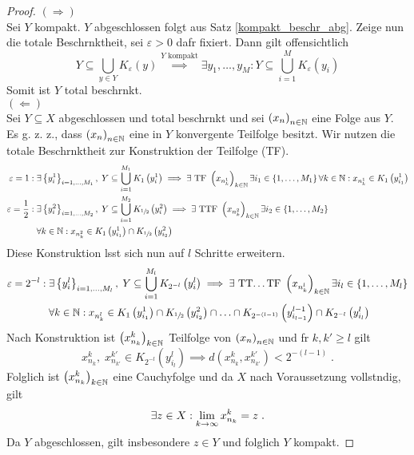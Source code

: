 \begin{proof}
	 \((\Longrightarrow)\)\\
	 Sei $Y$ kompakt. $Y$ abgeschlossen folgt aus Satz  \ref{kompakt_beschr_abg}. Zeige nun die totale Beschr\as nktheit, sei $\varepsilon>0$ daf\us r fixiert. Dann gilt offensichtlich
	 \[Y \subseteq \bigcup_{y\in Y} K_\varepsilon(y) \overset{\text{$Y$ kompakt}}{\implies}\exists y_1,\ldots,y_M: Y \subseteq \bigcup_{i=1}^M K_\varepsilon(y_i)\]
	 Somit ist $Y$ total beschr\as nkt. \\
	 \((\Longleftarrow)\)\\
	 Sei $Y\subseteq X$ abgeschlossen und total beschr\as nkt und sei \(\left (x_n\right )_{n\in \mathbb{N}}\) eine Folge aus $Y$. Es g. z. z., dass \(\left (x_n\right )_{n\in \mathbb{N}}\) eine in $Y$ konvergente Teilfolge besitzt. 
	 Wir nutzen die totale Beschr\as nktheit zur Konstruktion der Teilfolge (TF).
	 \begin{align*}
	  \varepsilon = 1: \; &\exists \left\{y^1_i\right\}_{i = 1,\ldots, M_1}, \; Y \subseteq \bigcup_{i=1}^{M_1} K_1\left(y^1_i\right) \implies \exists \text{ TF } \left (x_{n^1_k}\right )_{k\in \mathbb{N}} \exists i_1 \in \left\{1,\ldots,M_1\right\} \forall k \in \mathbb{N}: x_{n^1_k} \in K_1\left(y_{i_1}^1\right) \\
	 	 \varepsilon = \frac{1}{2}: \; &\exists \left\{y^2_i\right\}_{i = 1,\ldots, M_2}, \; Y \subseteq \bigcup_{i=1}^{M_2} K_{\sfrac12}\left(y^2_i\right) \implies \exists \text{ TTF } \left (x_{n^2_k}\right )_{k\in \mathbb{N}} \exists i_2 \in \left\{1,\ldots,M_2\right\}\\
	 	 & \forall k \in \mathbb{N}: x_{n^2_k} \in K_1\left(y_{i_1}^1\right) \cap K_{\sfrac12}\left(y_{i_2}^2\right)
	 \end{align*}
	 Diese Konstruktion l\as sst sich nun auf $l$ Schritte erweitern.
	 \begin{align*}
	 	 \varepsilon = 2^{-l}: \; &\exists \left\{y^l_i\right\}_{i = 1,\ldots, M_l}, \; Y \subseteq \bigcup_{i=1}^{M_l} K_{2^{-l}}\left(y^l_i\right) \implies \exists \text{ TT\ldots TF } \left (x_{n^l_k}\right )_{k\in \mathbb{N}} \exists i_l \in \left\{1,\ldots,M_l\right\}\\
	 	& \forall k \in \mathbb{N}: x_{n^l_k} \in K_1\left(y_{i_1}^1\right) \cap K_{\sfrac12}\left(y_{i_2}^2\right) \cap \ldots \cap K_{2^{-(l-1)}}\left(y_{i_{l-1}}^{l-1}\right) \cap K_{2^{-l}}\left(y_{i_{l}}^l\right)
	 	\end{align*}
	 Nach Konstruktion ist \(\left (x_{n_k}^k\right )_{k\in \mathbb{N}}\) Teilfolge von \(\left (x_n\right )_{n\in \mathbb{N}}\) und f\us r \(k, k'\geq l\) gilt
	 \[x_{n_k}^k,\; x_{n_{k'}}^{k'} \in K_{2^{-l}}\left(y_{i_{l}}^l\right) \implies d\left(x_{n_k}^k, x_{n_{k'}}^{k'}\right) < 2^{-(l-1)}\;.\]
	 Folglich ist \(\left (x_{n_k}^k\right )_{k\in \mathbb{N}}\) eine Cauchyfolge und da $X$ nach Voraussetzung vollst\as ndig, gilt 
	 \[\exists z\in X: \lim_{k \to\infty} x_{n_k}^k = z \;.\]
	 Da $Y$ abgeschlossen, gilt insbesondere \(z\in Y\) und folglich $Y$ kompakt.
	\end{proof}
